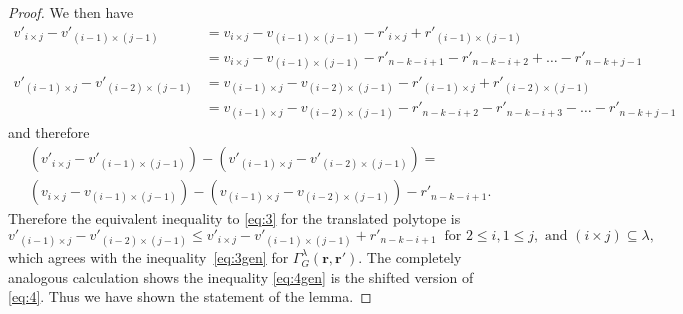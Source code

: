 \documentclass[10pt,a4paper]{amsart}
\begin{document}
\begin{proof}
We then have
\begin{equation*}
\begin{array}{ll}
v'_{i \times j}  - v'_{(i-1)\times (j-1)}&=  v_{i \times j}  - v_{(i-1)\times (j-1)} - r'_{i\times j}+r'_{(i-1)\times (j-1)}\\
&=v_{i \times j}  - v_{(i-1)\times (j-1)} -r'_{n-k-i+1}-r'_{n-k-i+2}+\dotsc- r'_{n-k+j-1}\\
v'_{(i-1) \times j}  - v'_{(i-2)\times (j-1)}&=  v_{(i-1) \times j}  - v_{(i-2)\times (j-1)}- r'_{(i-1)\times j}+r'_{(i-2)\times (j-1)}\\
&=v_{(i-1) \times j}  - v_{(i-2)\times (j-1)}- r'_{n-k-i+2}-r'_{n-k-i+3}-\dotsc - r'_{n-k+j-1}
	\end{array}
	\end{equation*}
	and therefore 
	\begin{multline*}
	\left(v'_{i \times j}  - v'_{(i-1)\times (j-1)}\right)-\left(v'_{(i-1) \times j}  - v'_{(i-2)\times (j-1)}\right)=\\
	\left(v_{i \times j}  - v_{(i-1)\times (j-1)}\right)-\left(v_{(i-1) \times j}  - v_{(i-2)\times (j-1)}\right)-r'_{n-k-i+1}.
	\end{multline*}
	Therefore the equivalent inequality to \eqref{eq:3} for the translated polytope is 
	\begin{equation}
	v'_{(i-1)\times j} - v'_{(i-2)\times (j-1)} \leq
v'_{i \times j}  - v'_{(i-1)\times (j-1)}+r'_{n-k-i+1}
\ \text{ for }2 \leq i, 
		1\leq j, \text{ and } (i \times j) \subseteq \lambda, \label{eq:3'}
		\end{equation}
		which agrees with the inequality~\eqref{eq:3gen} for $\Gamma^\lambda_G(\mathbf r,\mathbf r')$. 
		The completely analogous calculation shows the inequality \eqref{eq:4gen} is the shifted version of \eqref{eq:4}. Thus we have shown the statement of the lemma.
\end{proof}
\end{document}
